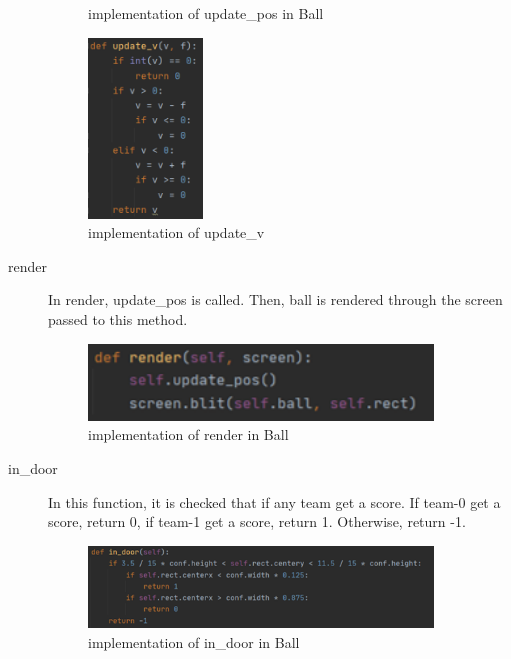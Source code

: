 \documentclass[14pt]{extarticle}
\begin{document}
\begin{description}
\begin{figure}[H]
\begin{center}
			\caption{implementation of update\_pos in Ball}
		\end{center}
	\end{figure}
	\begin{figure}[H]
		\begin{center}
			\includegraphics[width=0.3\textwidth]{update_v}
			\caption{implementation of update\_v}
		\end{center}
	\end{figure}
	\item[render]
	In render, update\_pos is called. Then, ball is rendered through the screen passed to this method.
	\begin{figure}[H]
		\begin{center}
			\includegraphics[width=0.9\textwidth]{Ball_render}
			\caption{implementation of render in Ball}
		\end{center}
	\end{figure}
	\item[in\_door]
	In this function, it is checked that if any team get a score. If team-0 get a score, return 0, if team-1 get a score, return 1. Otherwise, return -1.
	\begin{figure}[H]
		\begin{center}
			\includegraphics[width=0.9\textwidth]{Ball_in_door}
			\caption{implementation of in\_door in Ball}
		\end{center}
	\end{figure}
\end{description}
\end{document}
